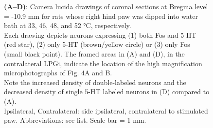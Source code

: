 \documentclass[a4paper,12pt,twoside]{report}
\begin{document}
\begin{figure}[p]
{\protect\parbox[t]{18cm}{
\begin{small}
\textbf{(A–D)}: Camera lucida drawings of coronal sections at Bregma level = -10.9 mm for rats whose right hind paw was dipped into water bath at 33, 46, 48, and 52 °C, respectively.\\
Each drawing depicts neurons expressing (1) both Fos and 5-HT (red star), (2) only 5-HT (brown/yellow circle) or (3) only Fos (small black point). The framed areas in (A) and (D), in the contralateral LPGi, indicate the location of the high magnification microphotographs of Fig. 4A and B.\\
Note the increased density of double-labeled neurons and the decreased density of single 5-HT labeled neurons in (D) compared to (A).\\
Ipsilateral, Contralateral: side ipsilateral, contralateral to stimulated paw. Abbreviations: see list. Scale bar = 1 mm.
\end{small}}}

\label{Article2-FIG3}

\end{figure}
\end{document}
